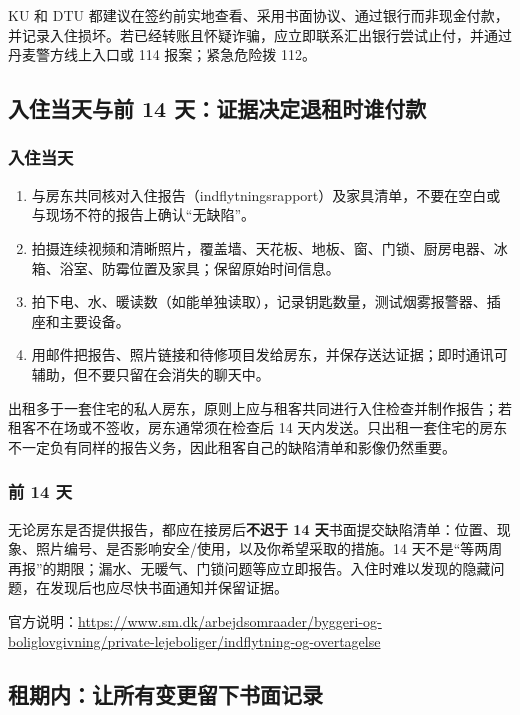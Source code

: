 KU 和 DTU 都建议在签约前实地查看、采用书面协议、通过银行而非现金付款，并记录入住损坏。若已经转账且怀疑诈骗，应立即联系汇出银行尝试止付，并通过丹麦警方线上入口或 114 报案；紧急危险拨 112。

\subsection{入住当天与前 14 天：证据决定退租时谁付款}

\subsubsection{入住当天}

\begin{enumerate}[leftmargin=2.2em,itemsep=3pt]
  \item 与房东共同核对入住报告（indflytningsrapport）及家具清单，不要在空白或与现场不符的报告上确认“无缺陷”。
  \item 拍摄连续视频和清晰照片，覆盖墙、天花板、地板、窗、门锁、厨房电器、冰箱、浴室、防霉位置及家具；保留原始时间信息。
  \item 拍下电、水、暖读数（如能单独读取），记录钥匙数量，测试烟雾报警器、插座和主要设备。
  \item 用邮件把报告、照片链接和待修项目发给房东，并保存送达证据；即时通讯可辅助，但不要只留在会消失的聊天中。
\end{enumerate}

出租多于一套住宅的私人房东，原则上应与租客共同进行入住检查并制作报告；若租客不在场或不签收，房东通常须在检查后 14 天内发送。只出租一套住宅的房东不一定负有同样的报告义务，因此租客自己的缺陷清单和影像仍然重要。

\subsubsection{前 14 天}

无论房东是否提供报告，都应在接房后\textbf{不迟于 14 天}书面提交缺陷清单：位置、现象、照片编号、是否影响安全/使用，以及你希望采取的措施。14 天不是“等两周再报”的期限；漏水、无暖气、门锁问题等应立即报告。入住时难以发现的隐藏问题，在发现后也应尽快书面通知并保留证据。

官方说明：\url{https://www.sm.dk/arbejdsomraader/byggeri-og-boliglovgivning/private-lejeboliger/indflytning-og-overtagelse}

\subsection{租期内：让所有变更留下书面记录}

